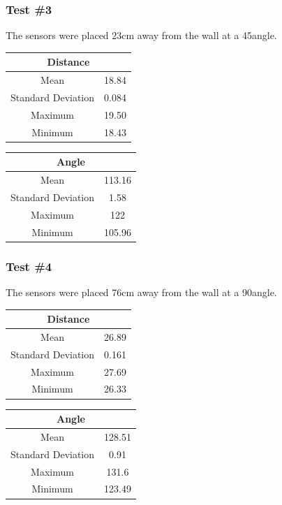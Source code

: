 \documentclass[12pt]{report}
\begin{document}
\subsubsection{Test \#3}
The sensors were placed 23cm away from the wall at a 45\textdegree angle.
\begin{center}
\begin{tabular}{ |c|c| } 
\hline
\multicolumn{2}{|c|}{Distance}\\
\hline
 Mean & 18.84 \\ 
 Standard Deviation & 0.084\\
 Maximum & 19.50\\
 Minimum & 18.43\\
 \hline
\end{tabular}
\quad
\begin{tabular}{ |c|c| } 
\hline
\multicolumn{2}{|c|}{Angle}\\
\hline
 Mean & 113.16 \\ 
 Standard Deviation & 1.58\\
 Maximum & 122\\
 Minimum & 105.96\\
 \hline
\end{tabular}
\end{center}

\subsubsection{Test \#4}
The sensors were placed 76cm away from the wall at a 90\textdegree angle.
\begin{center}
\begin{tabular}{ |c|c| } 
\hline
\multicolumn{2}{|c|}{Distance}\\
\hline
 Mean & 26.89 \\ 
 Standard Deviation & 0.161\\
 Maximum & 27.69\\
 Minimum & 26.33\\
 \hline
\end{tabular}
\quad
\begin{tabular}{ |c|c| } 
\hline
\multicolumn{2}{|c|}{Angle}\\
\hline
 Mean & 128.51\\ 
 Standard Deviation & 0.91\\
 Maximum & 131.6\\
 Minimum & 123.49\\
 \hline
\end{tabular}
\end{center}
\end{document}

